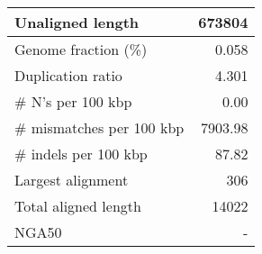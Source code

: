 \documentclass[12pt,a4paper]{article}
\begin{document}
\begin{table}[ht]
\begin{center}
\begin{tabular}{|l*{1}{|r}|}
Unaligned length & 673804 \\ \hline
Genome fraction (\%) & 0.058 \\ \hline
Duplication ratio & 4.301 \\ \hline
\# N's per 100 kbp & 0.00 \\ \hline
\# mismatches per 100 kbp & 7903.98 \\ \hline
\# indels per 100 kbp & 87.82 \\ \hline
Largest alignment & 306 \\ \hline
Total aligned length & 14022 \\ \hline
NGA50 & - \\ \hline
\end{tabular}
\end{center}
\end{table}
\end{document}
